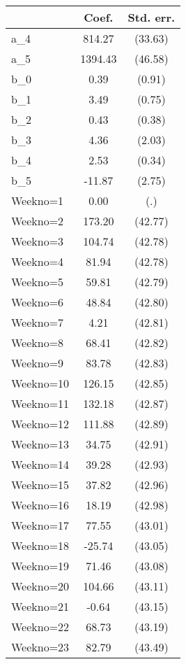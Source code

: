 {
\def\sym#1{\ifmmode^{#1}\else\(^{#1}\)\fi}
\begin{tabular}{l*{1}{cc}}
\hline\hline
                &    Coef.&Std. err.\\
\hline
a\_4             &   814.27&  (33.63)\\
a\_5             &  1394.43&  (46.58)\\
b\_0             &     0.39&   (0.91)\\
b\_1             &     3.49&   (0.75)\\
b\_2             &     0.43&   (0.38)\\
b\_3             &     4.36&   (2.03)\\
b\_4             &     2.53&   (0.34)\\
b\_5             &   -11.87&   (2.75)\\
Weekno=1        &     0.00&      (.)\\
Weekno=2        &   173.20&  (42.77)\\
Weekno=3        &   104.74&  (42.78)\\
Weekno=4        &    81.94&  (42.78)\\
Weekno=5        &    59.81&  (42.79)\\
Weekno=6        &    48.84&  (42.80)\\
Weekno=7        &     4.21&  (42.81)\\
Weekno=8        &    68.41&  (42.82)\\
Weekno=9        &    83.78&  (42.83)\\
Weekno=10       &   126.15&  (42.85)\\
Weekno=11       &   132.18&  (42.87)\\
Weekno=12       &   111.88&  (42.89)\\
Weekno=13       &    34.75&  (42.91)\\
Weekno=14       &    39.28&  (42.93)\\
Weekno=15       &    37.82&  (42.96)\\
Weekno=16       &    18.19&  (42.98)\\
Weekno=17       &    77.55&  (43.01)\\
Weekno=18       &   -25.74&  (43.05)\\
Weekno=19       &    71.46&  (43.08)\\
Weekno=20       &   104.66&  (43.11)\\
Weekno=21       &    -0.64&  (43.15)\\
Weekno=22       &    68.73&  (43.19)\\
Weekno=23       &    82.79&  (43.49)\\

\end{tabular}}
